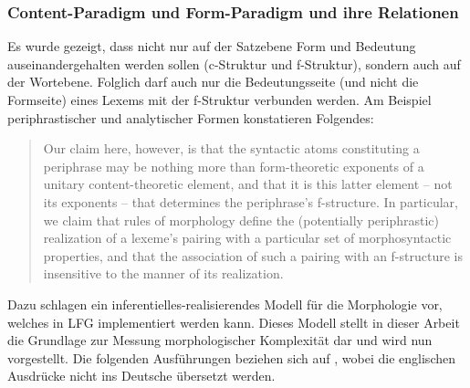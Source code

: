 \subsubsection{Content-Paradigm und Form-Paradigm und ihre Relationen}\label{4.1.3.1}

Es wurde gezeigt, dass nicht nur auf der Satzebene Form und Bedeutung auseinandergehalten werden sollen (c-Struk\-tur und f-Struk\-tur), sondern auch auf der Wortebene. Folglich darf auch nur die Bedeutungsseite (und nicht die Formseite) eines Lexems mit der f-Struk\-tur verbunden werden. Am Beispiel periphrastischer und analytischer Formen konstatieren \citet{AckermanStump2004} Folgendes:

\begin{quote}\largerpage
Our claim here, however, is that the syntactic atoms constituting a periphrase may be nothing more than form-theoretic exponents of a unitary content-theoretic element, and that it is this latter element – not its exponents – that determines the periphrase’s f-structure. In particular, we claim that rules of morphology define the (potentially periphrastic) realization of a lexeme’s pairing with a particular set of morphosyntactic properties, and that the association of such a pairing with an f-structure is insensitive to the manner of its realization. \citep[117]{AckermanStump2004}
\end{quote}

Dazu schlagen \citet{AckermanStump2004} ein in\-fe\-ren\-tiel\-les-re\-a\-li\-sie\-ren\-des Modell für die Morphologie vor, welches in LFG implementiert werden kann. Dieses Modell stellt in dieser Arbeit die Grundlage zur Messung morphologischer Komplexität dar und wird nun vorgestellt. Die folgenden Ausführungen beziehen sich auf \citet[117–124]{AckermanStump2004}, wobei die englischen Ausdrücke nicht ins Deutsche übersetzt werden.

